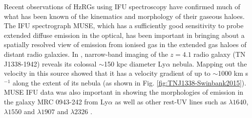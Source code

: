 Recent observations of HzRGs using IFU spectroscopy have confirmed much of what has been known of the kinematics and morphology of their gaseous haloes. The IFU spectrograph MUSE, which has a sufficiently good sensitivity to probe extended diffuse emission in the optical, has been important in bringing about a spatially resolved view of emission from ionised gas in the extended gas haloes of distant radio galaxies. In \citet{swinbank2015}, narrow-band imaging of the $z=4.1$ radio galaxy (TN J1338-1942) reveals its colossal $\sim$150 kpc diameter Ly$\alpha$ nebula. Mapping out the velocity in this source showed that it has a velocity gradient of up to $\sim$1000 km s$^{-1}$ along the extent of its nebula (as shown in Fig. \ref{fig:TNJ1338-Swinbank2015}). MUSE IFU data was also important in showing the morphologies of emission in the galaxy MRC 0943-242 from Ly$\alpha$ as well as other rest-UV lines such as  $\lambda1640$,  $\lambda1550$ and \ion{C}{iii]} $\lambda1907$ and \ion{C}{ii]} $\lambda2326$ \citep{Gullberg2016a,Silva2018}. 

